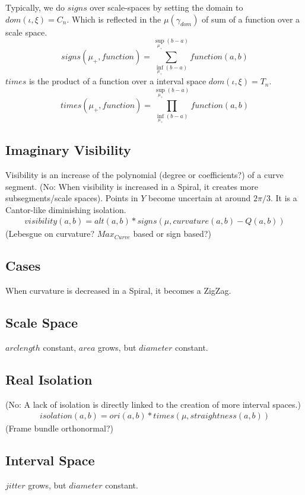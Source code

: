 \documentclass{report}
\begin{document}
Typically, we do $signs$ over scale-spaces by setting the domain to $dom(\iota,\xi)=C_{n}$.
Which is reflected in the $\mu(\gamma_{dom})$ of sum of a function over a scale space.\\
\begin{equation}
signs(\mu_{+},function )= \sum \limits _{\inf \limits _{\mu_{+}} (b-a)}^{\sup \limits _{\mu_{+}} (b-a)} function (a,b)
\end{equation}
$times$ is the product of a function over a interval space $dom(\iota,\xi)=T_{n}$.
\begin{equation}
times(\mu_{+},function) = \prod_{\inf \limits _{\mu_{+}} (b-a)}^{\sup \limits _{\mu_{+}} (b-a)} function(a,b)
\end{equation}

\subsection{Imaginary Visibility}
Visibility is an increase of the polynomial (degree or coefficients?) of a curve segment.
(No: When visibility is increased in a Spiral, it creates more subsegments/scale spaces). Points in $Y$ become uncertain at around $2\pi/3$. It is a Cantor-like diminishing isolation.
\begin{align}
visibility(a,b)= alt(a,b) * signs(\mu,curvature(a,b)-Q(a,b))
\end{align}
(Lebesgue on curvature? $Max_{Curve}$ based or sign based?)
\subsection*{Cases}
When curvature is decreased in a Spiral, it becomes a ZigZag.
\subsection*{Scale Space}
$arclength$ constant, $area$ grows, but $diameter$ constant.

\subsection{Real Isolation}
(No: A lack of isolation is directly linked to the creation of more interval spaces.)
\begin{align}
isolation(a,b) = ori(a,b)*times(\mu,straightness(a,b))
\end{align}
(Frame bundle orthonormal?)
\subsection*{Interval Space}
$jitter$ grows, but $diameter$ constant.
\end{document}
